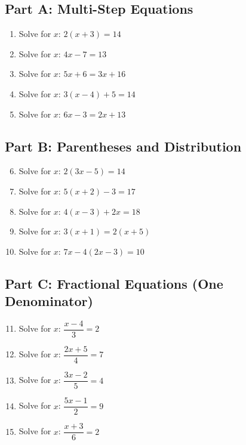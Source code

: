 \documentclass[14pt]{extarticle}
\begin{document}
\subsection*{Part A: Multi-Step Equations}
\begin{enumerate}
    \item Solve for \(x\): \(2(x + 3) = 14\)
    \item Solve for \(x\): \(4x - 7 = 13\)
    \item Solve for \(x\): \(5x + 6 = 3x + 16\)
    \item Solve for \(x\): \(3(x - 4) + 5 = 14\)
    \item Solve for \(x\): \(6x - 3 = 2x + 13\)
\end{enumerate}

\subsection*{Part B: Parentheses and Distribution}
\begin{enumerate}
    \setcounter{enumi}{5}
    \item Solve for \(x\): \(2(3x - 5) = 14\)
    \item Solve for \(x\): \(5(x + 2) - 3 = 17\)
    \item Solve for \(x\): \(4(x - 3) + 2x = 18\)
    \item Solve for \(x\): \(3(x + 1) = 2(x + 5)\)
    \item Solve for \(x\): \(7x - 4(2x - 3) = 10\)
\end{enumerate}

\subsection*{Part C: Fractional Equations (One Denominator)}
\begin{enumerate}
    \setcounter{enumi}{10}
    \item Solve for \(x\): \(\dfrac{x - 4}{3} = 2\)
    \item Solve for \(x\): \(\dfrac{2x + 5}{4} = 7\)
    \item Solve for \(x\): \(\dfrac{3x - 2}{5} = 4\)
    \item Solve for \(x\): \(\dfrac{5x - 1}{2} = 9\)
    \item Solve for \(x\): \(\dfrac{x + 3}{6} = 2\)
\end{enumerate}
\end{document}
